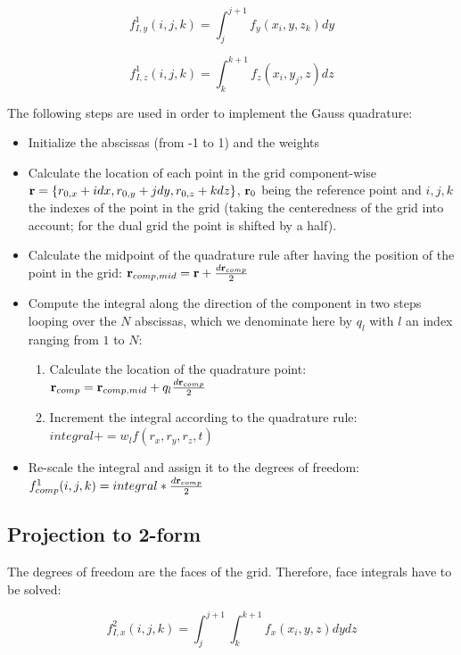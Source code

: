 \documentclass[11pt]{article}
\begin{document}
\begin{equation}
    f_{I,y}^1(i, j, k) = \int _{j} ^ {j+1} f_y (x_i, y, z_k) dy
\end{equation}

\begin{equation}
    f_{I,z}^1(i, j, k) = \int _{k} ^ {k+1} f_z (x_i, y_j, z) dz
\end{equation}


The following steps are used in order to implement the Gauss quadrature:

\begin{itemize}
    \item Initialize the abscissas (from -1 to 1) and the weights
    \item Calculate the location of each point in the grid component-wise $\mathbf{r} = \{ r_{0,x} + idx, r_{0,y} + jdy, r_{0,z} + kdz \}$, $\mathbf{r}_0$ being the reference point and $i, j, k$ the indexes of the point in the grid (taking the centeredness of the grid into account; for the dual grid the point is shifted by a half).
    \item Calculate the midpoint of the quadrature rule after having the position of the point in the grid: $\mathbf{r}_{comp,mid} = \mathbf{r} + \frac{d\mathbf{r}_{comp}}{2}$
    \item Compute the integral along the direction of the component in two steps looping over the $N$ abscissas, which we denominate here by $q_l$ with $l$ an index ranging from $1$ to $N$:
        \begin{enumerate}
        \item Calculate the location of the quadrature point: $\mathbf{r}_{comp} = \mathbf{r}_{comp, mid} + q_l \frac{d\mathbf{r}_{comp}}{2}$
        \item Increment the integral according to the quadrature rule: $integral += w_l f(r_x, r_y, r_z, t)$
        \end{enumerate}
    \item Re-scale the integral and assign it to the degrees of freedom: $f_{comp}^1(i, j, k) = integral * \frac{d\mathbf{r}_{comp}}{2}$
\end{itemize}

\subsection{Projection to 2-form}
The degrees of freedom are the faces of the grid. Therefore, face integrals have to be solved:

\begin{equation}
    f_{I,x}^2(i, j, k) = \int _{j} ^ {j+1} \int _{k} ^ {k+1} f_x (x_i, y, z) dy dz
\end{equation}
\end{document}
